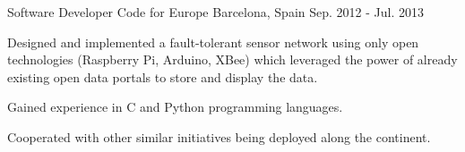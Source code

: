 \begin{cventries}
  \cventry
    {Software Developer} %
    {Code for Europe} %
    {Barcelona, Spain} %
    {Sep. 2012 - Jul. 2013} %
    {
      \begin{cvitems} %
        \item {Designed and implemented a fault-tolerant sensor network using only open technologies (Raspberry Pi, Arduino, XBee) which leveraged the power of already existing open data portals to store and display the data.}
        \item {Gained experience in C and Python programming languages.}
        \item {Cooperated with other similar initiatives being deployed along the continent.}
      \end{cvitems}
    }

\end{cventries}
